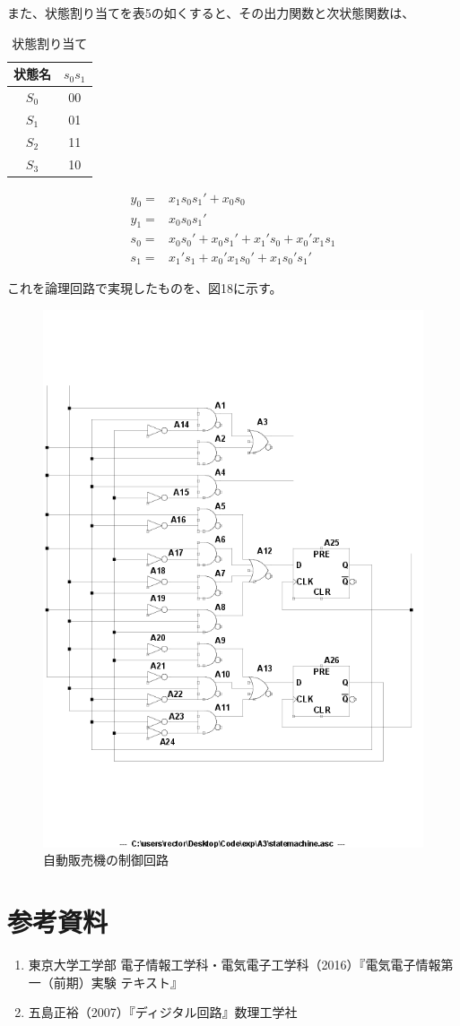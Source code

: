 \documentclass[10pt,a4j,dvipdfmx]{jsarticle}
\makeatletter
\let\@oldsec\section
\renewcommand{\section}[1]{\@oldsec{#1}\vspace{-5pt}{\color{TealBlue}\hrule height 0.6pt \hfill}\par}
\makeatother
\begin{document}
また、状態割り当てを表5の如くすると、その出力関数と次状態関数は、
\begin{table}[H]
    \centering
    \caption{状態割り当て}
    \begin{tabular}{|c||c|} \hline
      状態名 & $s_0s_1$ \\ \hline \hline
      $S_0$ & 00 \\
      $S_1$ & 01 \\
      $S_2$ & 11 \\
      $S_3$ & 10 \\
      \hline
    \end{tabular}
\end{table}

\begin{align}
y_0 =& x_1s_0s_1' + x_0s_0\\
y_1 =& x_0s_0s_1'\\
s_0 =& x_0s_0' + x_0s_1' + x_1's_0 + x_0'x_1s_1\\
s_1 =& x_1's_1 + x_0'x_1s_0' + x_1s_0's_1'
\end{align}

これを論理回路で実現したものを、図18に示す。

\begin{figure}[H]
       \centering
       \includegraphics[width=17cm]{statemachine.png}
       \caption{自動販売機の制御回路}
\end{figure}

\section{参考資料}
\begin{enumerate}
\item 東京大学工学部 電子情報工学科・電気電子工学科（2016）『電気電子情報第一（前期）実験 テキスト』
\item 五島正裕（2007）『ディジタル回路』数理工学社
\end{enumerate}
\end{document}

